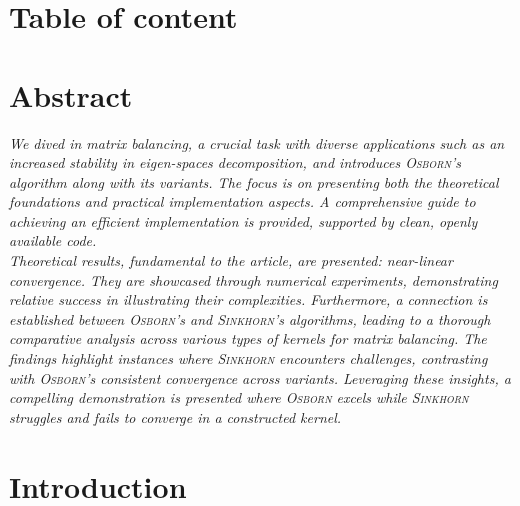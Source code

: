 \newpage

\makeatletter
\section*{Table of content}
\vspace{.05\textwidth}
\thispagestyle{empty} %
\clearpage %

\setcounter{page}{1} %

\makeatother
\newpage

\section*{Abstract}
\begin{adjustwidth}{30pt}{30pt}
     \textit{
        We dived in matrix balancing, a crucial task with diverse applications such as an increased stability in eigen-spaces decomposition, and introduces \textsc{Osborn}'s algorithm along with its variants. The focus is on presenting both the theoretical foundations and practical implementation aspects. A comprehensive guide to achieving an efficient implementation is provided, supported by clean, openly available code.
     }\\

     \textit{
        Theoretical results, fundamental to the article, are presented: near-linear convergence. They are showcased through numerical experiments, demonstrating relative success in illustrating their complexities. Furthermore, a connection is established between \textsc{Osborn}'s and \textsc{Sinkhorn}'s algorithms, leading to a thorough comparative analysis across various types of kernels for matrix balancing. The findings highlight instances where \textsc{Sinkhorn} encounters challenges, contrasting with \textsc{Osborn}'s consistent convergence across variants. Leveraging these insights, a compelling demonstration is presented where \textsc{Osborn} excels while \textsc{Sinkhorn} struggles and fails to converge in a constructed kernel.
     }
\end{adjustwidth}
\vspace*{10pt}

\section{Introduction}

